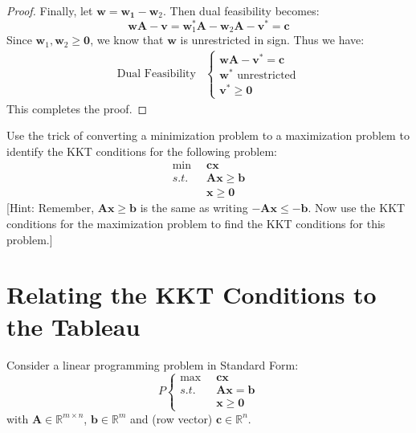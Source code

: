 \begin{proof}
Finally, let $\mathbf{w} = \mathbf{w_1} - \mathbf{w}_2$. Then dual feasibility becomes:
\begin{equation}
\mathbf{w}\mathbf{A} - \mathbf{v} = \mathbf{w}_1^*\mathbf{A} -\mathbf{w}_2\mathbf{A}- \mathbf{v}^* = \mathbf{c}
\end{equation}
Since $\mathbf{w}_1,\mathbf{w}_2 \geq \mathbf{0}$, we know that $\mathbf{w}$ is unrestricted in sign. Thus we have:
\begin{align}
\text{Dual Feasibility}&\left\{ 
\begin{aligned}
\mathbf{w}\mathbf{A} - \mathbf{v}^* = \mathbf{c}\\
\mathbf{w}^* \text{ unrestricted}\\
\mathbf{v}^* \geq \mathbf{0}
\end{aligned}\right.
\end{align}
This completes the proof.
\end{proof}

\begin{exercise} Use the trick of converting a minimization problem to a maximization problem to identify the KKT conditions for the following problem:
\begin{equation}
\begin{aligned}
\min\;\; & \mathbf{c}\mathbf{x}\\
s.t.\;\;& \mathbf{A}\mathbf{x} \geq \mathbf{b}\\
& \mathbf{x} \geq \mathbf{0}
\end{aligned}
\end{equation}
[Hint: Remember, $\mathbf{A}\mathbf{x} \geq \mathbf{b}$ is the same as writing $-\mathbf{A}\mathbf{x} \leq -\mathbf{b}$. Now use the KKT conditions for the maximization problem to find the KKT conditions for this problem.]
\label{exer:MinKKT}
\end{exercise}

\section{Relating the KKT Conditions to the Tableau}
Consider a linear programming problem in Standard Form:
\begin{equation}
P\left\{
\begin{aligned}
\max\;\; & \mathbf{c}\mathbf{x}\\
s.t.\;\; & \mathbf{A}\mathbf{x} = \mathbf{b}\\
& \mathbf{x} \geq \mathbf{0}
\end{aligned}\right.
\end{equation}
with $\mathbf{A} \in \mathbb{R}^{m \times n}$, $\mathbf{b} \in \mathbb{R}^m$ and (row vector) $\mathbf{c} \in \mathbb{R}^n$.

